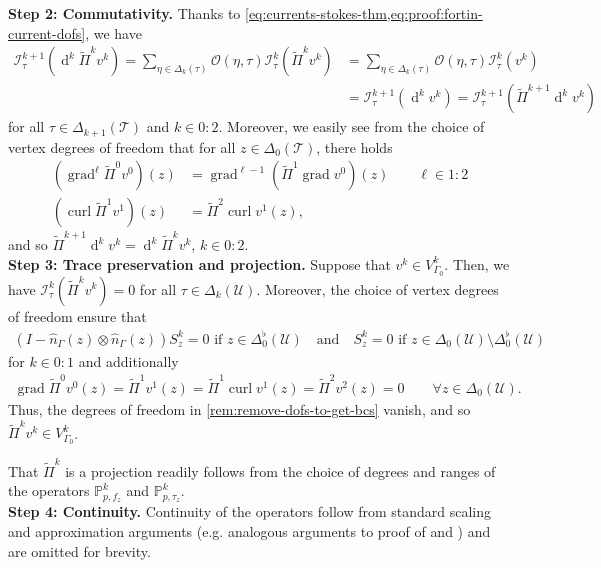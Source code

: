 \documentclass{mcom-l}
\theoremstyle{definition}
\theoremstyle{remark}
\numberwithin{equation}{section}
\newcommand{\unitvec}[1]{\hat{#1}}
\DeclareMathOperator{\curl}{curl}
\DeclareMathOperator{\grad}{grad}
\DeclareMathOperator{\dee}{d}
\newcommand{\mesh}[0]{\mathcal{T}}
\newcommand{\boundarymesh}[0]{\mathcal{U}}
\begin{document}
\noindent \textbf{Step 2: Commutativity. } Thanks to 
\cref{eq:currents-stokes-thm,eq:proof:fortin-current-dofs}, we have 
\begin{align*}
	\mathcal{I}_{\tau}^{k+1}( \dee^k \tilde{\Pi}^k v^k) 
	= \sum_{\eta \in \Delta_{k}(\tau)} \mathcal{O}(\eta, \tau)
	\mathcal{I}_{\tau}^{k}(\tilde{\Pi}^k v^k)
	&= \sum_{\eta \in \Delta_{k}(\tau)} \mathcal{O}(\eta, \tau)
	\mathcal{I}_{\tau}^{k}(v^k) \\
	&= \mathcal{I}_{\tau}^{k+1}( \dee^k v^k) 
	=  \mathcal{I}_{\tau}^{k+1}( \tilde{\Pi}^{k+1} \dee^k v^k)
\end{align*}
for all $\tau \in \Delta_{k+1}(\mesh)$ and $k \in 0:2$.
Moreover, we easily see from the choice of vertex degrees of freedom that 
for all $z \in \Delta_0(\mesh)$, there holds
\begin{align*}
	(\grad^{\ell} \tilde{\Pi}^0 v^0)(z) 
	&= \grad^{\ell-1} (\tilde{\Pi}^1 \grad v^0)(z)
	\qquad \ell \in 1:2 \\
	(\curl \tilde{\Pi}^1 v^1)(z) &= \tilde{\Pi}^2 \curl v^1 (z),
\end{align*}
and so $\tilde{\Pi}^{k+1} \dee^k v^k = \dee^k \tilde{\Pi}^{k} v^k$, 
$k \in 0:2$. \\

\noindent \textbf{Step 3: Trace preservation and projection. } Suppose that 
$v^k \in V^k_{\Gamma_0}$. Then, we have $\mathcal{I}^k_{\tau}(\tilde{\Pi}^k v^k) = 0$
for all $\tau \in \Delta_k(\boundarymesh)$.
Moreover, the choice of vertex
degrees of freedom ensure that
\begin{align*}
	(I - \unitvec{n}_{\Gamma}(z) \otimes \unitvec{n}_{\Gamma}(z)) S_z^k = 0
	\text{ if } z \in \Delta_0^{\flat}(\boundarymesh)
	\quad \text{and} \quad 
	S^k_z = 0 \text{ if } z \in \Delta_0(\boundarymesh) 
	\setminus \Delta_0^{\flat}(\boundarymesh)
\end{align*} 
for $k \in 0:1$ and additionally 
\begin{align*}
	\grad \tilde{\Pi}^0 v^0(z) = \tilde{\Pi}^1 v^1(z) 
	= \tilde{\Pi}^1 \curl v^1(z) = \tilde{\Pi}^2 v^2(z) = 0
	\qquad \forall z \in \Delta_0(\boundarymesh).
\end{align*}
Thus, the degrees of freedom in \cref{rem:remove-dofs-to-get-bcs}
vanish, and so $\tilde{\Pi}^k v^k \in V^k_{\Gamma_0}$.

That $\tilde{\Pi}^k$ is a projection readily follows from the choice 
of degrees and ranges of the operators $\mathbb{P}^k_{p, f_z}$ and 
$\mathbb{P}^k_{p, \tau_z}$. \\

\noindent \textbf{Step 4: Continuity. } Continuity of the operators 
follow from standard scaling and approximation arguments 
(e.g. analogous arguments to proof of 
\cite[Theorem 3.14]{Hiptmair02} and \cite{ScottZhang90}) and are omitted 
for brevity. \hfill \qedsymbol



\end{document}
